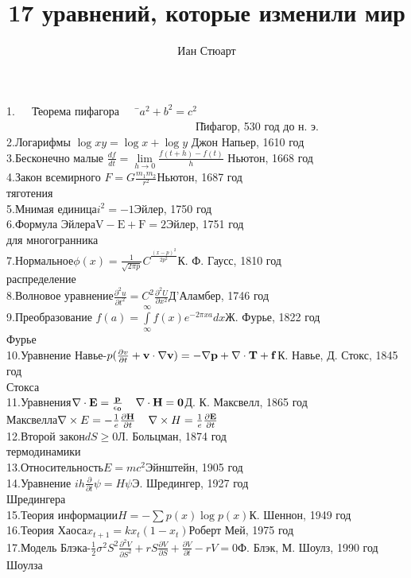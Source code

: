 \documentclass{article}
\title{17 уравнений, которые изменили мир}
\author{Иан Стюарт }
\date{}
\begin{document}
\maketitle
\begin{tabbing}
1.\ \ \ \=Теорема пифагора \ \ \ \=$a^2+b^2=c^2$ \ \ \ \ \ \ \ \ \ \ \ \ \ \ \ \ \ \ \ \ \ \ \ \ \ \ \ \ \ \ \ \ \ \ \=Пифагор, 530 год до н. э.\\
2.\>Логарифмы \>$\log xy = \log x + \log y$ \>Джон Напьер, 1610 год\\
3.\>Бесконечно малые \>$\frac{df}{dt} = \lim \limits_{h\to 0} \frac{f(t+h)-f(t)}{h}$ \>Ньютон, 1668 год\\
4.\>Закон всемирного \>$F = G\frac{m_{1} m_{2}}{r^2}$\>Ньютон, 1687 год\\
\>тяготения\\
5.\>Мнимая единица\>$i^{2} = -1$\>Эйлер, 1750 год\\
6.\>Формула Эйлера\>$\mathrm{V}-\mathrm{E}+\mathrm{F}=2$\>Эйлер, 1751 год\\
\>для многогранника\\
7.\>Нормальное\>$\phi \left(x\right)=\frac{1}{\sqrt{2\pi p}}{C}^{\frac{{\left(x-p\right)}^{2}}{2{p}^{2}}}$\>К. Ф. Гаусс, 1810 год\\
\>распределение\\
8.\>Волновое уравнение\>$\frac{{\partial }^{2}u}{\partial {t}^{2}}={C}^{2}\frac{{\partial }^{2}U}{\partial {x}^{2}}$\>Д’Аламбер, 1746 год\\
9.\>Преобразование \>$f(a)=\underset{\infty }{\overset{\infty }{\int }}f\left(x\right){e}^{-2\pi xa}dx$\>Ж. Фурье, 1822 год\\
\>Фурье\\
10.\>Уравнение Навье-\>$p(\frac{\partial v}{\partial t}+\bf v \cdot \nabla \bf v) = - \nabla p + \nabla \cdot \bf T + \bf f $\>К. Навье, Д. Стокс, 1845 год\\
\>Стокса\\
11.\>Уравнения\>$\nabla \cdot \bf E = \frac{p}{\epsilon_0} $\ \ $ \nabla \cdot \bf H = 0$\>Д. К. Максвелл, 1865 год\\
\>Максвелла\>$\nabla  \times E = - \frac{1}{e} \frac{\partial \bf H}{\partial t} $\ \ $\nabla  \times H = \frac{1}{e} \frac{\partial \bf E}{\partial t} $\\
12.\>Второй закон\>$dS\ge 0 $\>Л. Больцман, 1874 год\\
\>термодинамики\\
13.\>Относительность\>$E=mc^2 $\>Эйнштейн, 1905 год\\
14.\>Уравнение \>$ih \frac{\partial}{\partial t} \psi = H \psi $\>Э. Шредингер, 1927 год\\
\>Шредингера\\
15.\>Теория информации\>$H = - \sum p(x) \log p(x) $\>К. Шеннон, 1949 год\\
16.\>Теория Хаоса\>$x_{t+1}=kx_{t}(1-x_{t}) $\>Роберт Мей, 1975 год\\
17.\>Модель Блэка-\>$\frac{1}{2} \sigma^2 S^2 \frac{\partial^2 V}{\partial S^2} + rS \frac{\partial V}{\partial S} + \frac{\partial V}{\partial t} - rV = 0$\>Ф. Блэк, М. Шоулз, 1990 год\\
\>Шоулза
\end{tabbing}
\end{document}
